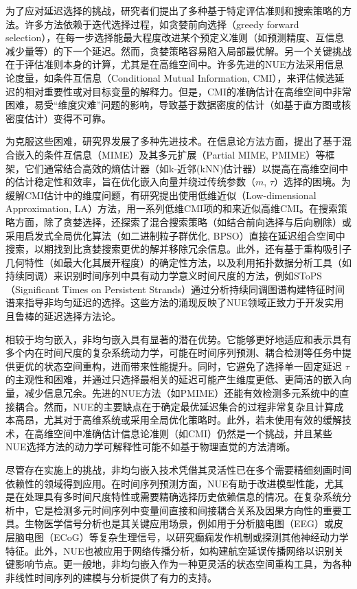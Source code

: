 为了应对延迟选择的挑战，研究者们提出了多种基于特定评估准则和搜索策略的方法。许多方法依赖于迭代选择过程，如贪婪前向选择（greedy forward selection），在每一步选择能最大程度改进某个预定义准则（如预测精度、互信息减少量等）的下一个延迟。然而，贪婪策略容易陷入局部最优解。另一个关键挑战在于评估准则本身的计算，尤其是在高维空间中。许多先进的NUE方法采用信息论度量，如条件互信息（Conditional Mutual Information, CMI），来评估候选延迟的相对重要性或对目标变量的解释力。但是，CMI的准确估计在高维空间中非常困难，易受“维度灾难”问题的影响，导致基于数据密度的估计（如基于直方图或核密度估计）变得不可靠。

为克服这些困难，研究界发展了多种先进技术。在信息论方法方面，提出了基于混合嵌入的条件互信息（MIME）及其多元扩展（Partial MIME, PMIME）等框架，它们通常结合高效的熵估计器（如k-近邻(kNN)估计器）以提高在高维空间中的估计稳定性和效率，旨在优化嵌入向量并绕过传统参数（$m$, $\tau$）选择的困境。为缓解CMI估计中的维度问题，有研究提出使用低维近似（Low-dimensional Approximation, LA）方法，用一系列低维CMI项的和来近似高维CMI。在搜索策略方面，除了贪婪选择，还探索了混合搜索策略（如结合前向选择与后向剔除）或采用启发式全局优化算法（如二进制粒子群优化, BPSO）直接在延迟组合空间中搜索，以期找到比贪婪搜索更优的解并移除冗余信息。此外，还有基于重构吸引子几何特性（如最大化其展开程度）的确定性方法，以及利用拓扑数据分析工具（如持续同调）来识别时间序列中具有动力学意义时间尺度的方法，例如SToPS（Significant Times on Persistent Strands）通过分析持续同调图谱构建特征时间谱来指导非均匀延迟的选择。这些方法的涌现反映了NUE领域正致力于开发实用且鲁棒的延迟选择方法论。

相较于均匀嵌入，非均匀嵌入具有显著的潜在优势。它能够更好地适应和表示具有多个内在时间尺度的复杂系统动力学，可能在时间序列预测、耦合检测等任务中提供更优的状态空间重构，进而带来性能提升。同时，它避免了选择单一固定延迟 $\tau$ 的主观性和困难，并通过只选择最相关的延迟可能产生维度更低、更简洁的嵌入向量，减少信息冗余。先进的NUE方法（如PMIME）还能有效检测多元系统中的直接耦合。然而，NUE的主要缺点在于确定最优延迟集合的过程非常复杂且计算成本高昂，尤其对于高维系统或采用全局优化策略时。此外，若未使用有效的缓解技术，在高维空间中准确估计信息论准则（如CMI）仍然是一个挑战，并且某些NUE选择方法的动力学可解释性可能不如基于物理直觉的方法清晰。

尽管存在实施上的挑战，非均匀嵌入技术凭借其灵活性已在多个需要精细刻画时间依赖性的领域得到应用。在时间序列预测方面，NUE有助于改进模型性能，尤其是在处理具有多时间尺度特性或需要精确选择历史依赖信息的情况。在复杂系统分析中，它是检测多元时间序列中变量间直接和间接耦合关系及因果方向性的重要工具。生物医学信号分析也是其关键应用场景，例如用于分析脑电图（EEG）或皮层脑电图（ECoG）等复杂生理信号，以研究癫痫发作机制或探测其他神经动力学特征。此外，NUE也被应用于网络传播分析，如构建航空延误传播网络以识别关键影响节点。更一般地，非均匀嵌入作为一种更灵活的状态空间重构工具，为各种非线性时间序列的建模与分析提供了有力的支持。

